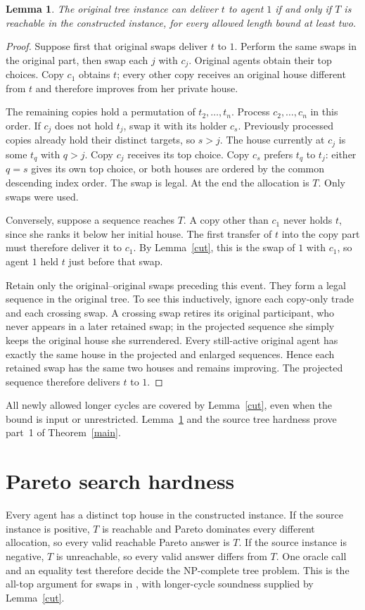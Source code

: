 \documentclass[11pt]{article}
\newtheorem{lemma}{Lemma}
\begin{document}
\begin{lemma}\label{equiv}
The original tree instance can deliver $t$ to agent $1$ if and only if
$T$ is reachable in the constructed instance, for every allowed length
bound at least two.
\end{lemma}
\begin{proof}
Suppose first that original swaps deliver $t$ to $1$. Perform the same
swaps in the original part, then swap each $j$ with $c_j$. Original
agents obtain their top choices. Copy $c_1$ obtains $t$; every other
copy receives an original house different from $t$ and therefore improves
from her private house.

The remaining copies hold a permutation of $t_2,\ldots,t_n$.
Process $c_2,\ldots,c_n$ in this order. If $c_j$ does not hold $t_j$,
swap it with its holder $c_s$. Previously processed copies already hold
their distinct targets, so $s>j$. The house currently at $c_j$ is some
$t_q$ with $q>j$. Copy $c_j$ receives its top choice. Copy $c_s$ prefers
$t_q$ to $t_j$: either $q=s$ gives its own top choice, or both houses
are ordered by the common descending index order. The swap is legal.
At the end the allocation is $T$. Only swaps were used.

Conversely, suppose a sequence reaches $T$. A copy other than $c_1$
never holds $t$, since she ranks it below her initial house. The first
transfer of $t$ into the copy part must therefore deliver it to $c_1$.
By Lemma~\ref{cut}, this is the swap of $1$ with $c_1$, so agent $1$
held $t$ just before that swap.

Retain only the original--original swaps preceding this event.
They form a legal sequence in the original tree. To see this inductively,
ignore each copy-only trade and each crossing swap. A crossing swap
retires its original participant, who never appears in a later retained
swap; in the projected sequence she simply keeps the original house
she surrendered. Every still-active original agent has exactly the same
house in the projected and enlarged sequences. Hence each retained swap
has the same two houses and remains improving. The projected sequence
therefore delivers $t$ to $1$.
\end{proof}

All newly allowed longer cycles are covered by Lemma~\ref{cut}, even
when the bound is input or unrestricted. Lemma~\ref{equiv} and the
source tree hardness prove part~1 of Theorem~\ref{main}.

\section{Pareto search hardness}
Every agent has a distinct top house in the constructed instance.
If the source instance is positive, $T$ is reachable and Pareto dominates
every different allocation, so every valid reachable Pareto answer is
$T$. If the source instance is negative, $T$ is unreachable, so every
valid answer differs from $T$. One oracle call and an equality test
therefore decide the NP-complete tree problem. This is the all-top
argument for swaps in \cite[Proposition 4]{swaps}, with longer-cycle
soundness supplied by Lemma~\ref{cut}.
\end{document}
